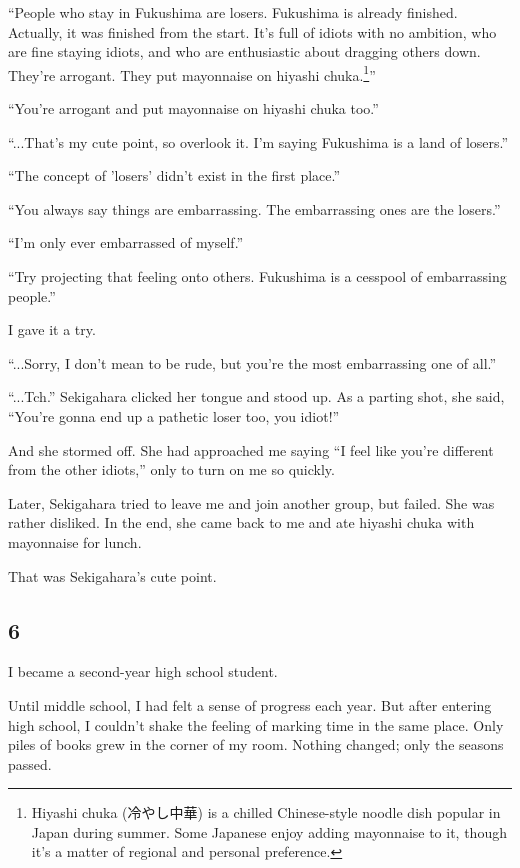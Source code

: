 \documentclass[
    a4paper,
    12pt,
    twoside,
    openany,
    UTF8,
    fontset=windows
]{ctexbook}
\begin{document}
``People who stay in Fukushima are losers. Fukushima is already finished. Actually, it was finished from the start. It's full of idiots with no ambition, who are fine staying idiots, and who are enthusiastic about dragging others down. They're arrogant. They put mayonnaise on hiyashi chuka.\footnote{Hiyashi chuka (冷やし中華) is a chilled Chinese-style noodle dish popular in Japan during summer. Some Japanese enjoy adding mayonnaise to it, though it's a matter of regional and personal preference.}''

``You're arrogant and put mayonnaise on hiyashi chuka too.''

``...That's my cute point, so overlook it. I'm saying Fukushima is a land of losers.''

``The concept of 'losers' didn't exist in the first place.''

``You always say things are embarrassing. The embarrassing ones are the losers.''

``I'm only ever embarrassed of myself.''

``Try projecting that feeling onto others. Fukushima is a cesspool of embarrassing people.''

I gave it a try.

``...Sorry, I don't mean to be rude, but you're the most embarrassing one of all.''

``...Tch.'' Sekigahara clicked her tongue and stood up. As a parting shot, she said, ``You're gonna end up a pathetic loser too, you idiot!''

And she stormed off. She had approached me saying ``I feel like you're different from the other idiots,'' only to turn on me so quickly.

Later, Sekigahara tried to leave me and join another group, but failed. She was rather disliked. In the end, she came back to me and ate hiyashi chuka with mayonnaise for lunch.

That was Sekigahara's cute point.


\subsection*{6}

I became a second-year high school student.

Until middle school, I had felt a sense of progress each year. But after entering high school, I couldn't shake the feeling of marking time in the same place. Only piles of books grew in the corner of my room. Nothing changed; only the seasons passed.
\end{document}
